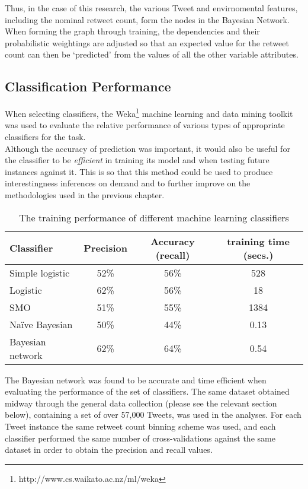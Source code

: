\begin{enumerate}
Thus, in the case of this research, the various Tweet and envirnomental features, including the nominal retweet count, form the nodes in the Bayesian Network. When forming the graph through training, the dependencies and their probabilistic weightings are adjusted so that an expected value for the retweet count can then be `predicted' from the values of all the other variable attributes.


\subsection{Classification Performance}
When selecting classifiers, the Weka\footnote{http://www.cs.waikato.ac.nz/ml/weka} machine learning and data mining toolkit was used to evaluate the relative performance of various types of appropriate classifiers for the task.\\
Although the accuracy of prediction was important, it would also be useful for the classifier to be \textit{efficient} in training its model and when testing future instances against it. This is so that this method could be used to produce interestingness inferences on demand and to further improve on the methodologies used in the previous chapter.

\begin{table}[h]\footnotesize
\begin{center}
\begin{tabular}{ l | c | c | c }
	Classifier	& Precision & Accuracy (recall) &  training time (secs.) \\
	\hline
	\hline 
	Simple logistic & 52\% &  56\% & 528\\
    Logistic        & 62\% &  56\% & 18\\
    SMO             & 51\% &  55\% & 1384\\
    Na\"{i}ve Bayesian & 50\% & 44\% & 0.13\\
    Bayesian network & 62\%&  64\% & 0.54
    \hline  
\end{tabular}
\end{center}
\caption{The training performance of different machine learning classifiers}
\label{table:classifierperformance}
\end{table}

The Bayesian network was found to be accurate and time efficient when evaluating the performance of the set of classifiers. The same dataset obtained midway through the general data collection (please see the relevant section below), containing a set of over 57,000 Tweets, was used in the analyses. For each Tweet instance the same retweet count binning scheme was used, and each classifier performed the same number of cross-validations against the same dataset in order to obtain the precision and recall values.



\end{enumerate}
